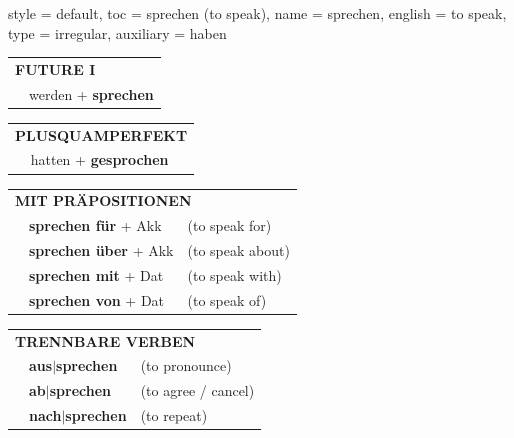 \begin{verbentry}{
  style = {default},
  toc = {sprechen (to speak)},
  name = {sprechen},
  english = {to speak},
  type = {irregular},
  auxiliary = {haben}
}
\begin{tabular}{rl}
    \multicolumn{2}{l}{\textbf{FUTURE I} }\\
   & werden + \textbf{sprechen}\\
 
  \end{tabular}
\hfill
   \begin{tabular}{rl}
      \multicolumn{2}{l}{\textbf{PLUSQUAMPERFEKT}}\\
   & hatten + \textbf{gesprochen}\\
  \end{tabular}
  
   \vspace{10pt}

   \begin{tabular}{lll}
      \multicolumn{3}{l}{\textbf{MIT PRÄPOSITIONEN}}\\
&\textbf{sprechen für} + Akk & (to speak for)\\
& \textbf{sprechen über} + Akk & (to speak about)\\
& \textbf{sprechen mit} + Dat & (to speak with)\\
&\textbf{sprechen von} + Dat & (to speak of)
  \end{tabular}
  \hfill
   \begin{tabular}{lll}
      \multicolumn{3}{l}{\textbf{TRENNBARE VERBEN}}\\
 & \textbf{aus$|$sprechen} & (to pronounce)\\
&\textbf{ab$|$sprechen} & (to agree / cancel)\\
&\textbf{nach$|$sprechen} & (to repeat)
\vspace{10pt}
  \end{tabular}
  

  \vspace{-5pt}
\end{verbentry}

